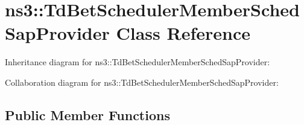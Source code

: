\hypertarget{classns3_1_1TdBetSchedulerMemberSchedSapProvider}{}\section{ns3\+:\+:Td\+Bet\+Scheduler\+Member\+Sched\+Sap\+Provider Class Reference}
\label{classns3_1_1TdBetSchedulerMemberSchedSapProvider}


Inheritance diagram for ns3\+:\+:Td\+Bet\+Scheduler\+Member\+Sched\+Sap\+Provider\+:


Collaboration diagram for ns3\+:\+:Td\+Bet\+Scheduler\+Member\+Sched\+Sap\+Provider\+:
\subsection*{Public Member Functions}
